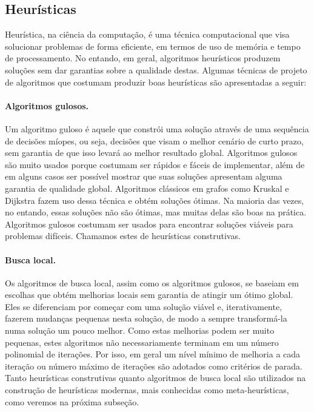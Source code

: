 \documentclass[12pt,a4paper]{article}
\begin{document}
\subsection{Heurísticas}

Heurística, na ciência da computação, é uma técnica computacional que visa  solucionar problemas de forma eficiente, em termos de uso de memória e tempo de processamento. No entando, em geral, algoritmos heurísticos produzem soluções sem dar garantias sobre a qualidade destas. Algumas técnicas de projeto de algoritmos que costumam produzir boas heurísticas são apresentadas a seguir:


\paragraph{Algoritmos gulosos.} Um algoritmo guloso é aquele que constrói uma solução através de uma sequência de decisões míopes, ou seja, decisões que visam o melhor cenário de curto prazo, sem garantia de que isso levará ao melhor resultado global. Algoritmos gulosos são muito usados porque costumam ser rápidos e fáceis de implementar, além de em alguns casos ser possível mostrar que suas soluções apresentam alguma garantia de qualidade global. Algoritmos clássicos em grafos como Kruskal e Dijkstra fazem uso dessa técnica e obtém soluções ótimas. Na maioria das vezes, no entando, essas soluções não são ótimas, mas muitas delas são boas na prática. Algoritmos gulosos costumam ser usados para encontrar soluções viáveis para problemas difíceis. Chamamos estes de heurísticas construtivas.

\paragraph{Busca local.} Os algoritmos de busca local, assim como os algoritmos gulosos, se baseiam em escolhas que obtém melhorias locais sem garantia de atingir um ótimo global. 
Eles se diferenciam por começar com uma solução viável e, iterativamente, fazerem mudanças pequenas nesta solução, de modo a sempre transformá-la numa solução um pouco melhor.
Como estas melhorias podem ser muito pequenas, estes algoritmos não necessariamente terminam em um número polinomial de iterações.
Por isso, em geral um nível mínimo de melhoria a cada iteração ou número máximo de iterações são adotados como critérios de parada.\\ 

Tanto heurísticas construtivas quanto algoritmos de busca local são utilizados na construção de heurísticas modernas, mais conhecidas como meta-heurísticas, como veremos na próxima subseção. 
\end{document}

